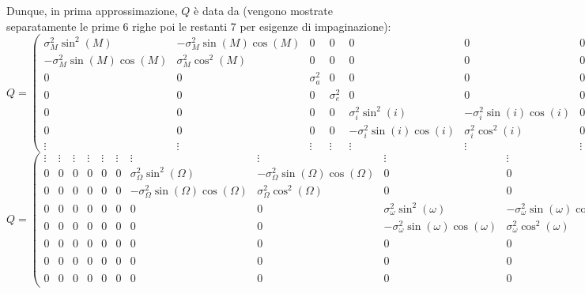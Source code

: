 \documentclass[12pt,a4paper,openright,twoside]{book}
\begin{document}
Dunque, in prima approssimazione, $Q$ è data da (vengono mostrate separatamente le prime 6 righe poi le restanti 7 per esigenze di impaginazione):
\begin{equation}
Q=\left(\begin{smallmatrix}
\sigma_M^2\sin^2(M) & -\sigma_M^2\sin(M)\cos(M) & 0 & 0 & 0 & 0 & 0 & 0 & 0 & 0 & 0 & 0 & 0 \\
-\sigma_M^2\sin(M)\cos(M) & \sigma_M^2\cos^2(M) & 0 & 0 & 0 & 0 & 0 & 0 & 0 & 0 & 0 & 0 & 0 \\
0 & 0 & \sigma_a^2 & 0 & 0 & 0 & 0 & 0 & 0 & 0 & 0 & 0 & 0 \\
0 & 0 & 0 & \sigma_e^2 & 0 & 0 & 0 & 0 & 0 & 0 & 0 & 0 & 0 \\
0 & 0 & 0 & 0 & \sigma_i^2\sin^2(i) & -\sigma_i^2\sin(i)\cos(i) & 0 & 0 & 0 & 0 & 0 & 0 & 0 \\
0 & 0 & 0 & 0 & -\sigma_i^2\sin(i)\cos(i) & \sigma_i^2\cos^2(i) & 0 & 0 & 0 & 0 & 0 & 0 & 0 \\
\vdots & \vdots & \vdots & \vdots & \vdots & \vdots & \vdots & \vdots & \vdots & \vdots & \vdots & \vdots & \vdots
\end{smallmatrix}\right)
\end{equation}
\begin{equation}
Q=\left(\begin{smallmatrix}
\vdots & \vdots & \vdots & \vdots & \vdots & \vdots & \vdots & \vdots & \vdots & \vdots & \vdots & \vdots & \vdots \\
0 & 0 & 0 & 0 & 0 & 0 & \sigma_\Omega^2\sin^2(\Omega) & -\sigma_\Omega^2\sin(\Omega)\cos(\Omega) & 0 & 0 & 0 & 0 & 0 \\
0 & 0 & 0 & 0 & 0 & 0 & -\sigma_\Omega^2\sin(\Omega)\cos(\Omega) & \sigma_\Omega^2\cos^2(\Omega) & 0 & 0 & 0 & 0 & 0 \\
0 & 0 & 0 & 0 & 0 & 0 & 0 & 0 & \sigma_\omega^2\sin^2(\omega) & -\sigma_\omega^2\sin(\omega)\cos(\omega) & 0 & 0 & 0 \\
0 & 0 & 0 & 0 & 0 & 0 & 0 & 0 & -\sigma_\omega^2\sin(\omega)\cos(\omega) & \sigma_\omega^2\cos^2(\omega) & 0 & 0 & 0 \\
0 & 0 & 0 & 0 & 0 & 0 & 0 & 0 & 0 & 0 & \sigma_n^2 & 0 & 0 \\
0 & 0 & 0 & 0 & 0 & 0 & 0 & 0 & 0 & 0 & 0 & \sigma_H^2 & 0 \\
0 & 0 & 0 & 0 & 0 & 0 & 0 & 0 & 0 & 0 & 0 & 0 & \sigma_G^2
\end{smallmatrix}\right)
\end{equation}
\end{document}
